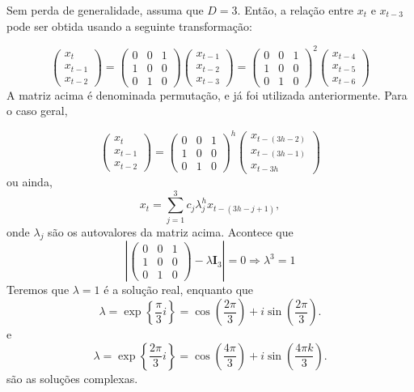 \documentclass[
  letterpaper,
  DIV=11,
  numbers=noendperiod]{scrartcl}
\theoremstyle{definition}
\theoremstyle{definition}
\theoremstyle{plain}
\theoremstyle{plain}
\theoremstyle{remark}
\begin{document}
Sem perda de generalidade, assuma que \(D=3\). Então, a relação entre
\(x_t\) e \(x_{t-3}\) pode ser obtida usando a seguinte transformação:

\[\left(\begin{array}{c}x_t\\ x_{t-1}\\ x_{t-2}\end{array}\right)=\left(\begin{array}{cc}0 & 0 & 1\\ 1 & 0 & 0\\ 0& 1 & 0\end{array}\right)\left(\begin{array}{c}x_{t-1}\\ x_{t-2}\\ x_{t-3}\end{array}\right)=\left(\begin{array}{cc}0 & 0 & 1\\ 1 & 0 & 0\\ 0& 1 & 0\end{array}\right)^2\left(\begin{array}{c}x_{t-4}\\ x_{t-5}\\ x_{t-6}\end{array}\right)\]
A matriz acima é denominada permutação, e já foi utilizada
anteriormente. Para o caso geral,

\[\left(\begin{array}{c}x_t\\ x_{t-1}\\ x_{t-2}\end{array}\right)=\left(\begin{array}{cc}0 & 0 & 1\\ 1 & 0 & 0\\ 0& 1 & 0\end{array}\right)^h\left(\begin{array}{c}x_{t-(3h-2)}\\ x_{t-(3h-1)}\\ x_{t-3h}\end{array}\right)\]
ou ainda, \[x_t=\sum_{j=1}^3 c_j\lambda_j^h x_{t-(3h-j+1)},\] onde
\(\lambda_j\) são os autovalores da matriz acima. Acontece que
\[\left|\left(\begin{array}{cc}0 & 0 & 1\\ 1 & 0 & 0\\ 0& 1 & 0\end{array}\right)-\lambda \textbf{I}_3\right|=0\Rightarrow \lambda^3=1\]
Teremos que \(\lambda=1\) é a solução real, enquanto que
\[\lambda= \exp\left\{\frac{\pi }{3}i\right\}=\cos\left(\frac{2\pi }{3}\right)+i\sin\left(\frac{2\pi}{3}\right).\]
e
\[\lambda= \exp\left\{\frac{2\pi }{3}i\right\}=\cos\left(\frac{4\pi }{3}\right)+i\sin\left(\frac{4\pi k}{3}\right).\]
são as soluções complexas.
\end{document}
